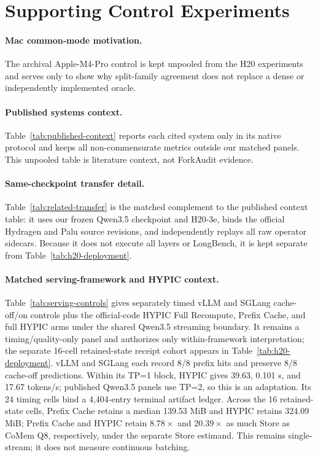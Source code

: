 \documentclass{article}
\begin{document}
\section{Supporting Control Experiments}
\label{app:controls}

\paragraph{Mac common-mode motivation.}
The archival Apple-M4-Pro control is kept unpooled from the H20 experiments and
serves only to show why split-family agreement does not replace a dense or
independently implemented oracle.


\paragraph{Published systems context.}
Table~\ref{tab:published-context} reports each cited system only in its native
protocol and keeps all non-commensurate metrics outside our matched panels.
This unpooled table is literature context, not ForkAudit evidence.


\paragraph{Same-checkpoint transfer detail.}
Table~\ref{tab:related-transfer} is the matched complement to the published
context table: it uses our frozen Qwen3.5 checkpoint and H20-3e, binds the
official Hydragen and Palu source revisions, and independently replays all raw
operator sidecars.  Because it does not execute all layers or LongBench, it is
kept separate from Table~\ref{tab:h20-deployment}.


\paragraph{Matched serving-framework and HYPIC context.}
Table~\ref{tab:serving-controls} gives separately timed vLLM and SGLang
cache-off/on controls plus the official-code HYPIC Full Recompute, Prefix
Cache, and full HYPIC arms under the shared Qwen3.5 streaming boundary.  It
remains a timing/quality-only panel and authorizes only within-framework
interpretation; the separate 16-cell retained-state receipt cohort appears in
Table~\ref{tab:h20-deployment}.
vLLM and SGLang each record 8/8 prefix hits and preserve 8/8 cache-off
predictions.  Within its TP=1 block, HYPIC gives 39.63, 0.101 s, and 17.67
tokens/s; published Qwen3.5 panels use TP=2, so this is an adaptation.  Its 24
timing cells bind a 4,404-entry terminal artifact ledger.  Across the
16 retained-state cells, Prefix Cache retains a median 139.53 MiB and HYPIC
retains 324.09 MiB; Prefix Cache and HYPIC retain $8.78\times$ and
$20.39\times$ as much Store as CoMem Q8, respectively, under the separate
Store estimand.  This remains single-stream; it does not measure continuous
batching.

\end{document}
